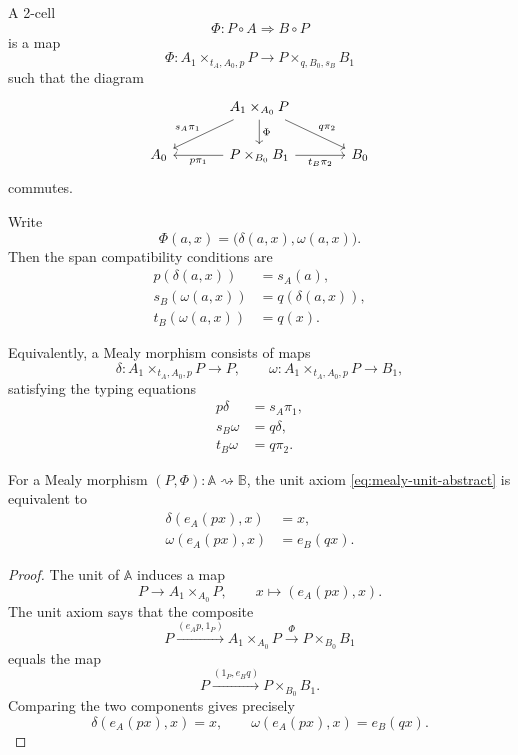 A 2-cell
\[
\Phi:P\circ A\Rightarrow B\circ P
\]
is a map
\[
\Phi:
A_1\times_{t_A,A_0,p}P
\longrightarrow
P\times_{q,B_0,s_B}B_1
\]
such that the diagram
\[
\begin{tikzcd}[column sep=large]
&
A_1\times_{A_0}P
\arrow[dl, "s_A\pi_1"']
\arrow[dr, "q\pi_2"]
\arrow[d, "\Phi"]
&
\\
A_0
&
P\times_{B_0}B_1
\arrow[l, "p\pi_1"]
\arrow[r, "t_B\pi_2"']
&
B_0
\end{tikzcd}
\]
commutes.

Write
\[
\Phi(a,x)=\bigl(\delta(a,x),\omega(a,x)\bigr).
\]
Then the span compatibility conditions are
\begin{align}
p(\delta(a,x))&=s_A(a),
\label{eq:mealy-left-typing}
\\
s_B(\omega(a,x))&=q(\delta(a,x)),
\label{eq:mealy-output-source}
\\
t_B(\omega(a,x))&=q(x).
\label{eq:mealy-output-target}
\end{align}

Equivalently, a Mealy morphism consists of maps
\[
\delta:
A_1\times_{t_A,A_0,p}P\to P,
\qquad
\omega:
A_1\times_{t_A,A_0,p}P\to B_1,
\]
satisfying the typing equations
\begin{align}
p\delta&=s_A\pi_1,
\label{eq:mealy-definition-pdelta}
\\
s_B\omega&=q\delta,
\label{eq:mealy-definition-source}
\\
t_B\omega&=q\pi_2.
\label{eq:mealy-definition-target}
\end{align}

\begin{proposition}
\label{prop:mealy-unit-law}
For a Mealy morphism \((P,\Phi):\mathbb A\rightsquigarrow\mathbb B\), the unit axiom \eqref{eq:mealy-unit-abstract} is equivalent to
\begin{align}
\delta(e_A(p x),x)&=x,
\label{eq:delta-unit}
\\
\omega(e_A(p x),x)&=e_B(qx).
\label{eq:omega-unit}
\end{align}
\end{proposition}

\begin{proof}
The unit of \(\mathbb A\) induces a map
\[
P\to A_1\times_{A_0}P,
\qquad
x\mapsto (e_A(p x),x).
\]
The unit axiom says that the composite
\[
P
\xrightarrow{(e_Ap,1_P)}
A_1\times_{A_0}P
\xrightarrow{\Phi}
P\times_{B_0}B_1
\]
equals the map
\[
P
\xrightarrow{(1_P,e_Bq)}
P\times_{B_0}B_1.
\]
Comparing the two components gives precisely
\[
\delta(e_A(p x),x)=x,
\qquad
\omega(e_A(p x),x)=e_B(qx).
\]
\end{proof}

